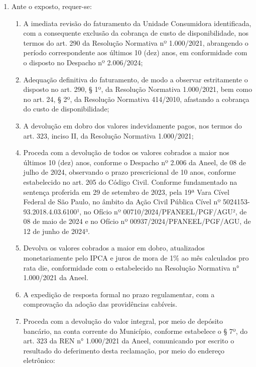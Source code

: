 \begin{enumerate}[resume]
\item Ante o exposto, requer-se:
    \begin{enumerate}
    \item A imediata revisão do faturamento da Unidade Consumidora identificada, com a consequente exclusão da cobrança de custo de disponibilidade, nos termos do art. 290 da Resolução Normativa nº 1.000/2021, abrangendo o período correspondente aos últimos 10 (dez) anos, em conformidade com o disposto no Despacho nº 2.006/2024;
    \item Adequação definitiva do faturamento, de modo a observar estritamente o disposto no art. 290, § 1º, da Resolução Normativa 1.000/2021, bem como no art. 24, § 2º, da Resolução Normativa 414/2010, afastando a cobrança do custo de disponibilidade;
    \item A devolução em dobro dos valores indevidamente pagos, nos termos do art. 323, inciso II, da Resolução Normativa 1.000/2021;
    \item Proceda com a devolução de todos os valores cobrados a maior nos últimos 10 (dez) anos, conforme o Despacho nº 2.006 da Aneel, de 08 de julho de 2024, observando o prazo prescricional de 10 anos, conforme estabelecido no art. 205 do Código Civil. Conforme fundamentado na sentença proferida em 29 de setembro de 2023, pela 19ª Vara Cível Federal de São Paulo, no âmbito da Ação Civil Pública Cível nº 5024153- 93.2018.4.03.6100¹, no Ofício nº 00710/2024/PFANEEL/PGF/AGU², de 08 de maio de 2024 e no Ofício nº 00937/2024/PFANEEL/PGF/AGU, de 12 de junho de 2024³.
    \item Devolva os valores cobrados a maior em dobro, atualizados monetariamente pelo IPCA e juros de mora de 1\% ao mês calculados pro rata die, conformidade com o estabelecido na Resolução Normativa n° 1.000/2021 da Aneel.
    \item A expedição de resposta formal no prazo regulamentar, com a comprovação da adoção das providências cabíveis.
    \item Proceda com a devolução do valor integral, por meio de depósito bancário, na conta corrente do Município, conforme estabelece o § 7º, do art. 323 da REN n° 1.000/2021 da Aneel, comunicando por escrito o resultado do deferimento desta reclamação, por meio do endereço eletrônico: \emailEmpresa{}
    \end{enumerate}
\end{enumerate}